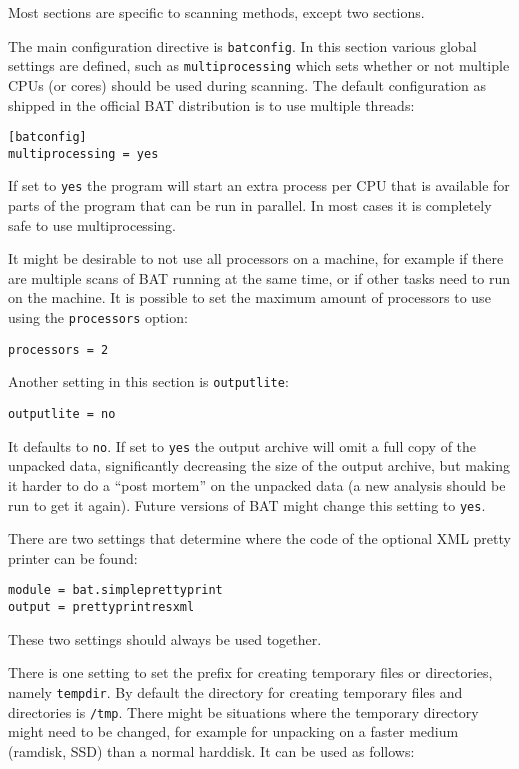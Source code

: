 \documentclass[10pt]{article}
\begin{document}
Most sections are specific to scanning methods, except two sections.

The main configuration directive is \texttt{batconfig}. In this
section various global settings are defined, such as \texttt{multiprocessing}
which sets whether or not multiple CPUs (or cores) should be used during
scanning. The default configuration as shipped in the official BAT distribution
is to use multiple threads:

\begin{verbatim}
[batconfig]
multiprocessing = yes
\end{verbatim}

If set to \texttt{yes} the program will start an extra process per CPU that is
available for parts of the program that can be run in parallel. In most cases
it is completely safe to use multiprocessing.

It might be desirable to not use all processors on a machine, for example if
there are multiple scans of BAT running at the same time, or if other tasks
need to run on the machine. It is possible to set the maximum amount of
processors to use using the \texttt{processors} option:

\begin{verbatim}
processors = 2
\end{verbatim}

Another setting in this section is \texttt{outputlite}:

\begin{verbatim}
outputlite = no
\end{verbatim}

It defaults to \texttt{no}. If set to \texttt{yes} the output archive will omit
a full copy of the unpacked data, significantly decreasing the size of the
output archive, but making it harder to do a ``post mortem'' on the unpacked
data (a new analysis should be run to get it again). Future versions of BAT
might change this setting to \texttt{yes}.

There are two settings that determine where the code of the optional XML pretty
printer can be found:

\begin{verbatim}
module = bat.simpleprettyprint
output = prettyprintresxml
\end{verbatim}

These two settings should always be used together.

There is one setting to set the prefix for creating temporary files or
directories, namely \texttt{tempdir}. By default the directory for creating
temporary files and directories is \texttt{/tmp}. There might be situations
where the temporary directory might need to be changed, for example for
unpacking on a faster medium (ramdisk, SSD) than a normal harddisk. It can be
used as follows:
\end{document}
